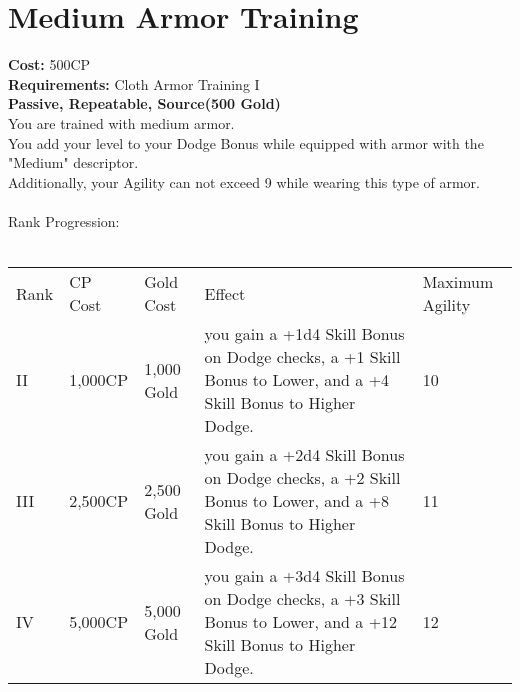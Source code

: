 \section{Medium Armor Training}\label{perk:mediumArmorTraining}
\textbf{Cost:} 500CP\\
\textbf{Requirements:} Cloth Armor Training I\\
\textbf{Passive, Repeatable, Source(500 Gold)}\\
You are trained with medium armor.\\
You add your level to your Dodge Bonus while equipped with armor with the "Medium" descriptor.\\
Additionally, your Agility can not exceed 9 while wearing this type of armor.\\
\\
Rank Progression:\\
\\
\begin{longtable}{l | l | l | l | p{9cm}}
	Rank & CP Cost & Gold Cost & Effect & Maximum Agility
	\\
	II
	& 1,000CP
	& 1,000 Gold
	& you gain a +1d4 Skill Bonus on Dodge checks, a +1 Skill Bonus to Lower, and a +4 Skill Bonus to Higher Dodge.
	& 10
	\\
	III
	& 2,500CP
	& 2,500 Gold
	& you gain a +2d4 Skill Bonus on Dodge checks, a +2 Skill Bonus to Lower, and a +8 Skill Bonus to Higher Dodge.
	& 11
	\\
	IV
	& 5,000CP
	& 5,000 Gold
	& you gain a +3d4 Skill Bonus on Dodge checks, a +3 Skill Bonus to Lower, and a +12 Skill Bonus to Higher Dodge.
	& 12
	\\
\end{longtable}